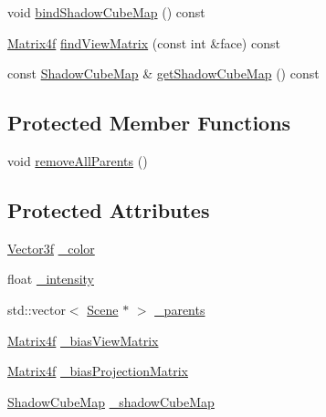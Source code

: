 \begin{DoxyCompactItemize}
\item 
void \hyperlink{classburn_1_1_light_a39e25024015dd3dc1668300d1807a189}{bind\-Shadow\-Cube\-Map} () const 
\item 
\hyperlink{namespaceburn_a643e9d2ffceb4304e3755a100268a7a3}{Matrix4f} \hyperlink{classburn_1_1_light_a601abfc3e38f459fcad0f0ceb1e71df2}{find\-View\-Matrix} (const int \&face) const 
\item 
const \hyperlink{classburn_1_1_shadow_cube_map}{Shadow\-Cube\-Map} \& \hyperlink{classburn_1_1_light_a01d43c41e03e7ec0f3ec37281a1cf920}{get\-Shadow\-Cube\-Map} () const 
\end{DoxyCompactItemize}
\subsection*{Protected Member Functions}
\begin{DoxyCompactItemize}
\item 
void \hyperlink{classburn_1_1_light_a5fce7c28e34206c39645bb383b823f48}{remove\-All\-Parents} ()
\end{DoxyCompactItemize}
\subsection*{Protected Attributes}
\begin{DoxyCompactItemize}
\item 
\hyperlink{namespaceburn_afdd7cfb352b9612432faf6947b6fff74}{Vector3f} \hyperlink{classburn_1_1_light_a6a49b033b4c1cb79e3d84e9ef74dbcda}{\-\_\-color}
\item 
float \hyperlink{classburn_1_1_light_a92fcb1a0d7bf3680d65108b59931658b}{\-\_\-intensity}
\item 
std\-::vector$<$ \hyperlink{classburn_1_1_scene}{Scene} $\ast$ $>$ \hyperlink{classburn_1_1_light_a33188aef471ba7c742c004a787c5a8b4}{\-\_\-parents}
\item 
\hyperlink{namespaceburn_a643e9d2ffceb4304e3755a100268a7a3}{Matrix4f} \hyperlink{classburn_1_1_light_a58333b9fd0fc2bf4e0cba73097b8e5c9}{\-\_\-bias\-View\-Matrix}
\item 
\hyperlink{namespaceburn_a643e9d2ffceb4304e3755a100268a7a3}{Matrix4f} \hyperlink{classburn_1_1_light_a18f86434a088d060af651fc1a2394cdf}{\-\_\-bias\-Projection\-Matrix}
\item 
\hyperlink{classburn_1_1_shadow_cube_map}{Shadow\-Cube\-Map} \hyperlink{classburn_1_1_light_af06e39faf3bc51663bc2f0e0302bd0d0}{\-\_\-shadow\-Cube\-Map}
\end{DoxyCompactItemize}


